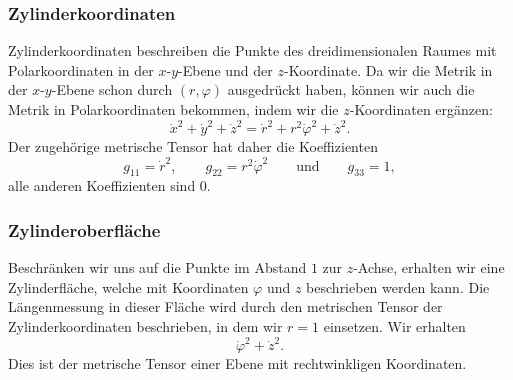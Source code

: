 \subsubsection{Zylinderkoordinaten}
Zylinderkoordinaten beschreiben die Punkte des dreidimensionalen
Raumes mit Polarkoordinaten in der $x$-$y$-Ebene und der $z$-Koordinate.
Da wir die Metrik in der $x$-$y$-Ebene schon durch $(r,\varphi)$
ausgedrückt haben, können wir auch die Metrik in Polarkoordinaten
bekommen, indem wir die $z$-Koordinaten ergänzen:
\[
\dot x^2+\dot y^2 +\dot z^2
=
\dot r^2 + r^2\dot\varphi^2 + \dot z^2.
\]
Der zugehörige metrische Tensor hat daher die Koeffizienten
\[
g_{11}=\dot r^2,\qquad
g_{22}=r^2\dot\varphi^2
\qquad\text{und}\qquad
g_{33}=1,
\]
alle anderen Koeffizienten sind $0$.

\subsubsection{Zylinderoberfläche}
Beschränken wir uns auf die Punkte im Abstand $1$ zur $z$-Achse, erhalten
wir eine Zylinderfläche, welche mit Koordinaten $\varphi$ und $z$
beschrieben werden kann.
Die Längenmessung in dieser Fläche wird durch den metrischen
Tensor der Zylinderkoordinaten beschrieben, in dem wir $r=1$ einsetzen.
Wir erhalten
\[
\dot\varphi^2+\dot z^2.
\]
Dies ist der metrische Tensor einer Ebene mit rechtwinkligen Koordinaten.

